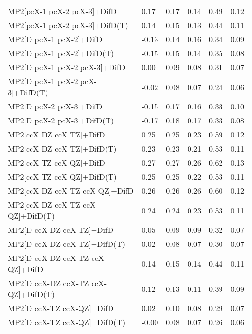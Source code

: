 \begin{table}
\begin{tabular}{l l l l l l }
    MP2[pcX-1 pcX-2 pcX-3]+DifD & 0.17 & 0.17 & 0.14 & 0.49 & 0.12 \\ 
    MP2[pcX-1 pcX-2 pcX-3]+DifD(T) & 0.14 & 0.15 & 0.13 & 0.44 & 0.11 \\ 
    MP2[D pcX-1 pcX-2]+DifD & -0.13 & 0.14 & 0.16 & 0.34 & 0.09 \\ 
    MP2[D pcX-1 pcX-2]+DifD(T) & -0.15 & 0.15 & 0.14 & 0.35 & 0.08 \\ 
    MP2[D pcX-1 pcX-2 pcX-3]+DifD & 0.00 & 0.09 & 0.08 & 0.31 & 0.07 \\ 
    MP2[D pcX-1 pcX-2 pcX-3]+DifD(T) & -0.02 & 0.08 & 0.07 & 0.24 & 0.06 \\ 
    MP2[D pcX-2 pcX-3]+DifD & -0.15 & 0.17 & 0.16 & 0.33 & 0.10 \\ 
    MP2[D pcX-2 pcX-3]+DifD(T) & -0.17 & 0.18 & 0.17 & 0.33 & 0.08 \\ 
    MP2[ccX-DZ ccX-TZ]+DifD & 0.25 & 0.25 & 0.23 & 0.59 & 0.12 \\ 
    MP2[ccX-DZ ccX-TZ]+DifD(T) & 0.23 & 0.23 & 0.21 & 0.53 & 0.11 \\ 
    MP2[ccX-TZ ccX-QZ]+DifD & 0.27 & 0.27 & 0.26 & 0.62 & 0.13 \\ 
    MP2[ccX-TZ ccX-QZ]+DifD(T) & 0.25 & 0.25 & 0.22 & 0.53 & 0.11 \\ 
    MP2[ccX-DZ ccX-TZ ccX-QZ]+DifD & 0.26 & 0.26 & 0.26 & 0.60 & 0.12 \\ 
    MP2[ccX-DZ ccX-TZ ccX-QZ]+DifD(T) & 0.24 & 0.24 & 0.23 & 0.53 & 0.11 \\ 
    MP2[D ccX-DZ ccX-TZ]+DifD & 0.05 & 0.09 & 0.09 & 0.32 & 0.07 \\ 
    MP2[D ccX-DZ ccX-TZ]+DifD(T) & 0.02 & 0.08 & 0.07 & 0.30 & 0.07 \\ 
    MP2[D ccX-DZ ccX-TZ ccX-QZ]+DifD & 0.14 & 0.15 & 0.14 & 0.44 & 0.11 \\ 
    MP2[D ccX-DZ ccX-TZ ccX-QZ]+DifD(T) & 0.12 & 0.13 & 0.11 & 0.39 & 0.09 \\ 
    MP2[D ccX-TZ ccX-QZ]+DifD & 0.02 & 0.10 & 0.08 & 0.29 & 0.07 \\ 
    MP2[D ccX-TZ ccX-QZ]+DifD(T) & -0.00 & 0.08 & 0.07 & 0.26 & 0.06 \\ 
    \bottomrule
  \end{tabular}
\end{table}
